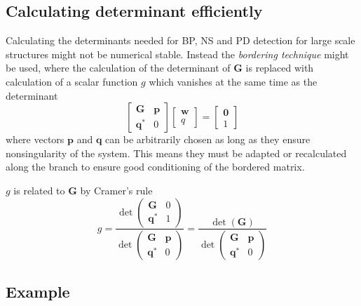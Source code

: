 \subsection{Calculating determinant efficiently}
\label{sec:bordering_tech}

Calculating the determinants needed for BP, NS and PD detection for large
scale structures might not be numerical stable. Instead the \textit{bordering
  technique} might be used, where the calculation of the determinant of $\bm G$
is replaced with calculation of a scalar function $g$ which vanishes at the same
time as the determinant \autocite{kuznetsov2013a}
\begin{equation}
  \begin{bmatrix}
    \bm G & \bm p \\
    \bm q^* & 0
  \end{bmatrix}
  \begin{bmatrix}
    \bm w \\ q
  \end{bmatrix}
  =
  \begin{bmatrix}
    \bm 0 \\ 1
  \end{bmatrix}
  \label{eq:bordered_system}
\end{equation}
where vectors $\bm p$ and $\bm q$ can be arbitrarily chosen as long as they
ensure nonsingularity of the system. This means they must be adapted or
recalculated along the branch to ensure good conditioning of the bordered
matrix.

$g$ is related to $\bm G$ by Cramer's rule
\begin{equation}
  g = \frac{\det
    \begin{pmatrix}
      \bm G & 0 \\
      \bm q^* & 1
    \end{pmatrix}}
  {\det
    \begin{pmatrix}
      \bm G & \bm p \\
      \bm q^* & 0
    \end{pmatrix}}
  =
  \frac{\det(\bm G)}
  {\det
    \begin{pmatrix}
      \bm G & \bm p \\
      \bm q^* & 0
    \end{pmatrix}}
\end{equation}


\subsection{Example}
\label{sec:bif_example}

